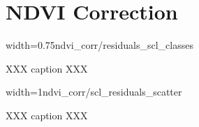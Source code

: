 \chapter{NDVI Correction}



\begin{my_figure}[ht]{width=0.75\textwidth}{ndvi_corr/residuals_scl_classes}
    \caption{XXX caption XXX}
    \label{fig:ndvi_corr/residuals_scl_classes}
\end{my_figure}


\begin{my_figure}[h]{width=1\textwidth}{ndvi_corr/scl_residuals_scatter}
    \caption{XXX caption XXX}
    \label{fig:ndvi_corr/scl_residuals_scatter}
\end{my_figure}
